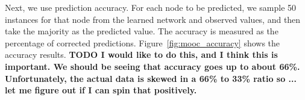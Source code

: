 \documentclass{article} %
\begin{document}

Next, we use prediction accuracy. For each node to be predicted, we sample 50 instances for that
node from the learned network and observed values, and then take the majority as the predicted
value. The accuracy is measured as the percentage of corrected predictions.
Figure~\ref{fig:mooc_accuracy} shows the accuracy results.  \textbf{TODO I would like to do this,
and I think this is important. We should be seeing that accuracy goes up to about 66\%.
Unfortunately, the actual data is skewed in a 66\% to 33\% ratio so ... let me figure out if I can
spin that positively.}
\end{document}
